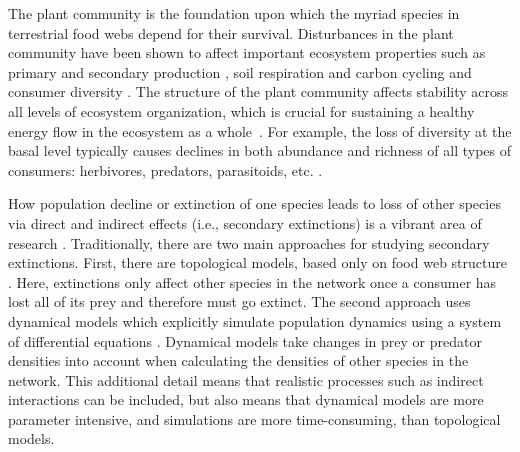 \documentclass[12pt]{article}
\begin{document}
\begin{spacing}{2.0}
     The plant community is the foundation upon which the myriad species in terrestrial food webs depend for their survival. Disturbances in the plant community have been shown to affect important ecosystem properties such as primary \citep{Hector1999} and secondary production \citep{borer2012plant}, soil respiration and carbon cycling \citep{chen2019plant} and consumer diversity \citep{scherber2010bottom, Baiser2016}.
     The structure of the plant community affects stability across all levels of ecosystem organization, which is crucial for sustaining a healthy energy flow in the ecosystem as a whole~\citep{proulx2010diversity, scherber2010bottom, Rosenblatt2016}. 
     For example, the loss of diversity at the basal level typically causes declines in both abundance and richness of all types of consumers: herbivores, predators, parasitoids, etc. \citep{scherber2010bottom}.
    
    How population decline or extinction of one species leads to loss of other species via direct and indirect effects (i.e., secondary extinctions) is a vibrant area of research \citep{Santos2021,curtsdotter2011robustness, dunne2009cascading, Eklof2006}. Traditionally, there are two main approaches for studying secondary extinctions. First, there are topological models, based only on food web structure \citep{dunne2009cascading}. Here, extinctions only affect other species in the network once a consumer has lost all of its prey and therefore must go extinct. The second approach uses dynamical models which explicitly simulate population dynamics using a system of differential equations \citep{binzer2011susceptibility}. Dynamical models take changes in prey or predator densities into account when calculating the densities of other species in the network. 
    This additional detail means that realistic processes such as indirect interactions can be included, but also means that dynamical models are more parameter intensive, and simulations are more time-consuming, than topological models. 
    

\end{spacing}
\end{document}
